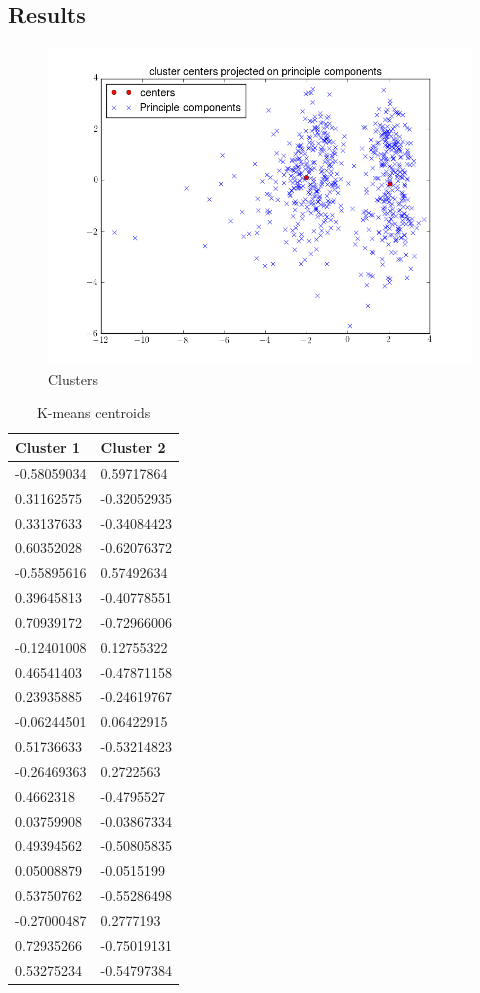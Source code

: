 \subsection{Results}
\begin{figure}[h]
\centering
\includegraphics[scale=0.5]{img/clusters.png}
\caption{Clusters}
\label{clusters}
\end{figure}
\newpage
\begin{table}[h]
\centering
\begin{tabular}{ll}
Cluster 1   & Cluster 2   \\\hline
-0.58059034 & 0.59717864  \\
0.31162575  & -0.32052935 \\
0.33137633  & -0.34084423 \\
0.60352028  & -0.62076372 \\
-0.55895616 & 0.57492634  \\
0.39645813  & -0.40778551 \\
0.70939172  & -0.72966006 \\
-0.12401008 & 0.12755322  \\
0.46541403  & -0.47871158 \\
0.23935885  & -0.24619767 \\
-0.06244501 & 0.06422915  \\
0.51736633  & -0.53214823 \\
-0.26469363 & 0.2722563   \\
0.4662318   & -0.4795527  \\
0.03759908  & -0.03867334 \\
0.49394562  & -0.50805835 \\
0.05008879  & -0.0515199  \\
0.53750762  & -0.55286498 \\
-0.27000487 & 0.2777193   \\
0.72935266  & -0.75019131 \\
0.53275234  & -0.54797384\\\hline
\end{tabular}
\caption{K-means centroids}
\label{tab:centroids}
\end{table}

